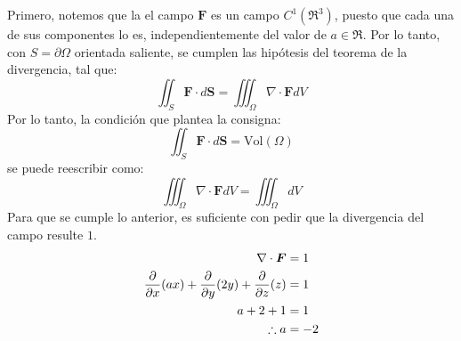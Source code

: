 \begin{solution}
    Primero, notemos que la el campo $\boldsymbol{F}$ es un campo $C^1(\Re^3)$, puesto que
    cada una de sus componentes lo es, independientemente del valor de $a \in \Re$.
    Por lo tanto, con $S = \partial \Omega$ orientada saliente, se cumplen las hipótesis del
    teorema de la divergencia, tal que:
    \begin{equation*}
        \iint_S \boldsymbol{F} \cdot d\boldsymbol{S} = \iiint_\Omega \nabla \cdot \boldsymbol{F} dV
    \end{equation*}
    Por lo tanto, la condición que plantea la consigna:
    \begin{equation*}
        \iint_S \boldsymbol{F} \cdot d\boldsymbol{S} = \text{Vol}(\Omega)
    \end{equation*}
    se puede reescribir como:
    \begin{equation*}
        \iiint_\Omega \nabla \cdot \boldsymbol{F} dV = \iiint_\Omega dV
    \end{equation*}
    Para que se cumple lo anterior, es suficiente con pedir que la divergencia del campo resulte $1$.
    \begin{align*}
        \nabla \cdot \boldsymbol{F} &= 1 \\
        \frac{\partial}{\partial x}(ax) + \frac{\partial}{\partial y}(2y) + \frac{\partial}{\partial z}(z) &= 1 \\
        a + 2 + 1 &= 1 \\
        \therefore a &= -2
    \end{align*}
\end{solution}